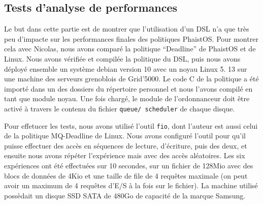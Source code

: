 \subsection{Tests d'analyse de performances}

Le but dans cette partie est de montrer que l'utilisation d'un DSL n'a que très 
peu d'impacte sur les performances finales des politiques PhaistOS. Pour 
montrer cela avec Nicolas, nous avons comparé la politique ``Deadline'' de 
PhaistOS et de Linux. Nous avons vérifiée et compilée la politique du DSL, puis 
nous avons déployé ensemble un système debian version 10 avec un noyau Linux 5.
13 sur une machine des serveurs grenoblois de Grid'5000. Le code C de la 
politique a été importé dans un des dossiers du répertoire personnel et nous 
l'avons compilé en tant que module noyau. Une fois chargé, le module de 
l'ordonnanceur doit être activé à travers le contenu du fichier \texttt{queue/
scheduler} de chaque disque.

Pour effetucer les tests, nous avons utilisé l'outil \texttt{fio}, dont 
l'auteur est aussi celui de la politique MQ-Deadline de Linux. Nous avons 
configuré l'outil pour qu'il puisse effectuer des accès en séquences de 
lecture, d'écriture, puis des deux, et ensuite nous avons répéter l'expérience 
mais avec des accès aléatoires. Les six expériences ont été effectuées sur 10 
secondes, sur un fichier de 128Mio avec des blocs de données de 4Kio et une 
taille de file de 4 requêtes maximale (on peut avoir un maximum de 4 requêtes 
d'E/S à la fois sur le fichier). La machine utilisé possèdait un disque SSD 
SATA de 480Go de capacité de la marque Samsung.

